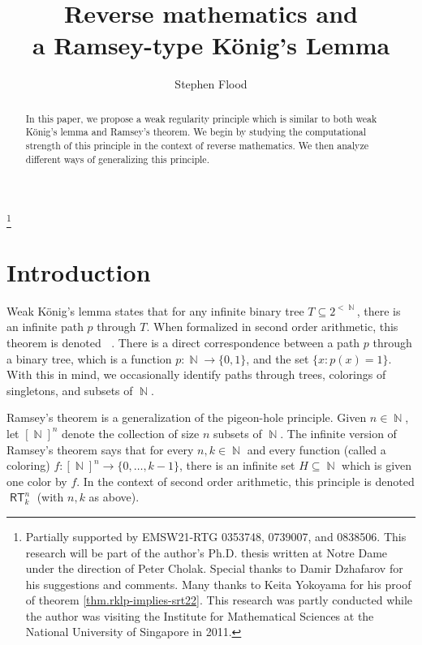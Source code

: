 \documentclass{amsart}
\title[A Ramsey-type K\"onig's Lemma]{Reverse mathematics and \\a Ramsey-type K\"onig's Lemma}
\author{Stephen Flood}
\theoremstyle{plain}
\theoremstyle{remark}
\theoremstyle{definition}
\DeclareMathOperator{\RT}{\mathsf{RT}}
\DeclareMathOperator{\WKL}{\mathsf{WKL}_0}
\DeclareMathOperator{\N}{\mathbb{N}}
\begin{document}
\begin{abstract}
	In this paper, we propose a weak regularity principle which is similar to both weak K\"onig's lemma and Ramsey's theorem.  We begin by studying the computational strength of this principle in the context of reverse mathematics.  
	We then analyze different ways of generalizing this principle.
\end{abstract}	

\thanks{
	Partially supported by EMSW21-RTG 0353748, 0739007, and 0838506.  
	This research will be part of the author's Ph.D. thesis written at Notre Dame under the direction of Peter Cholak.
	Special thanks to Damir Dzhafarov for his suggestions and comments. 
	Many thanks to Keita Yokoyama for his proof of theorem \ref{thm.rklp-implies-srt22}.  
	This research was partly conducted while the author was visiting the Institute for Mathematical Sciences at the  National University of Singapore in 2011.
}



\maketitle


\section{Introduction}

	Weak K\"onig's lemma states that for any infinite binary tree $T\subseteq 2^{<\N}$, there is an infinite path $p$ through $T$.  
	When formalized in second order arithmetic, this theorem is denoted $\WKL$.  
	There is a direct correspondence between a path $p$ through a binary tree, which is a function $p:\N\rightarrow\{0,1\}$, and the set $\{x : p(x)=1 \}$.  With this in mind, we occasionally identify paths through trees, colorings of singletons, and subsets of $\N$.  

	Ramsey's theorem is a generalization of the pigeon-hole principle.  Given $n\in\N$, let $[\N]^n$ denote the collection of size $n$ subsets of $\N$.  The infinite version of Ramsey's theorem says that for every $n,k\in\N$ and every function (called a coloring) $f:[\N]^n\rightarrow\{0,\dots,k-1\}$, there is an infinite set $H\subseteq\N$ which is given one color by $f$.  In the context of second order arithmetic, this principle is denoted $\RT^n_k$ (with $n,k$ as above). 
\end{document}
